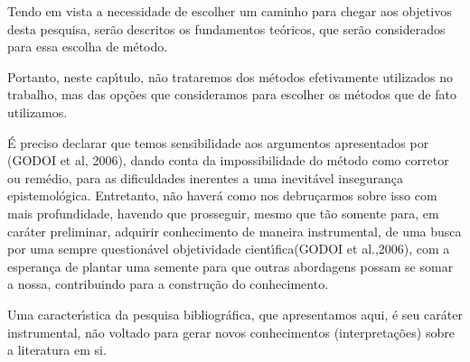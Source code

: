 \documentclass[
12pt,		%
openright,	%
twoside,  %
a4paper,			%
chapter=TITLE,		%
english,			%
french,				%
spanish,			%
brazil				%
]{USPSC-classe/USPSC}
\begin{document}
Tendo em vista a necessidade de escolher um caminho para chegar  aos objetivos desta pesquisa, ser\~ao descritos os fundamentos te\'oricos, que ser\~ao considerados para essa escolha de m\'etodo.

















Portanto, neste cap\'{\i}tulo, n\~ao trataremos dos m\'etodos efetivamente utilizados no trabalho, mas das op\c{c}\~oes que consideramos para escolher os m\'etodos que de fato utilizamos.

















\'E preciso declarar que temos sensibilidade aos argumentos apresentados por (GODOI et al, 2006), dando conta da impossibilidade \textquotedbl  do m\'etodo como corretor ou rem\'edio, para as dificuldades \textquotedbl inerentes a uma inevit\'avel inseguran\c{c}a epistemol\'ogica\textquotedbl . Entretanto, n\~ao haver\'a como nos debru\c{c}armos sobre isso com mais profundidade, havendo que prosseguir, mesmo que t\~ao somente para, em car\'ater preliminar, \textquotedbl adquirir conhecimento de maneira instrumental\textquotedbl , de uma busca por uma sempre question\'avel \textquotedbl objetividade cient\'{\i}fica\textquotedbl  (GODOI et al.,2006), com a esperan\c{c}a de plantar uma semente para que outras abordagens possam se somar a nossa, contribuindo para a constru\c{c}\~ao do conhecimento.

















Uma caracter\'{\i}stica da pesquisa bibliogr\'afica, que apresentamos aqui, \'e seu  car\'ater instrumental, n\~ao voltado para gerar novos conhecimentos (interpreta\c{c}\~oes) sobre a literatura em si.
\end{document}
